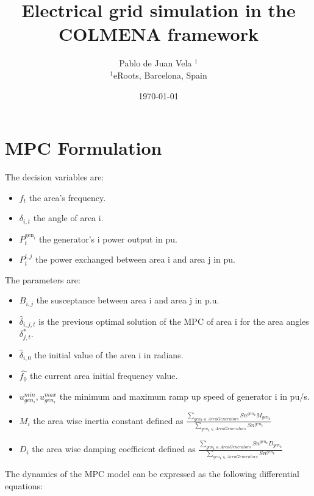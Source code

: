 \documentclass{article}
\title{Electrical grid simulation in the COLMENA framework}
\author{Pablo de Juan Vela $^{1}$ \\
        \small $^{1}$eRoots, Barcelona, Spain \\
}
\date{\today}
\begin{document}
\maketitle

\section{MPC Formulation}
The decision variables are:
\begin{itemize}
    \item $f_t$ the area's frequency.
    \item $\delta_{i,t}$ the angle of area i.
    \item $P^{\text{gen}_i}_t$ the generator's i power output in pu.
    \item $P^{i,j}_t$ the power exchanged between area i and area j in pu.
\end{itemize}

The parameters are:
\begin{itemize}
    \item $B_{i,j}$ the susceptance between area i and area j in p.u.
    \item $\hat{\delta}_{i,j,t}$ is the previous optimal solution of the MPC of area i for the area angles $\delta_{j,t}^*$.
    \item $\hat{\delta}_{i,0}$ the initial value of the area i in radians.
    \item $\hat{f_{0}}$ the current area initial frequency value.
    \item $u^{min}_{gen_i}, u^{max}_{gen_i}$ the minimum and maximum ramp up speed of generator i in pu/s.
    \item $M_i$ the area wise inertia constant defined as $\frac{\sum_{gen_k \in AreaGenerators} Sn^{gen_k}M_{gen_k}}{\sum_{gen_k \in AreaGenerators} Sn^{gen_k}}$ 
    \item $D_i$ the area wise damping coefficient defined as $\frac{\sum_{gen_k \in AreaGenerators} Sn^{gen_k}D_{gen_k}}{\sum_{gen_k \in AreaGenerators} Sn^{gen_k}}$ 
\end{itemize}


The dynamics of the MPC model can be expressed as the following differential equations:
\end{document}
